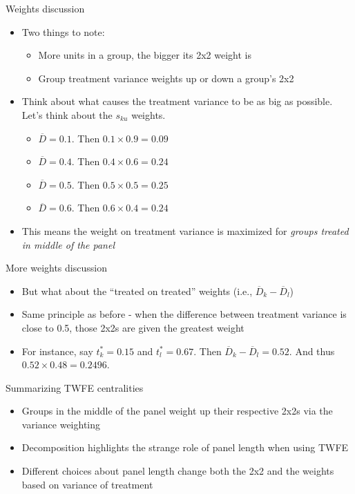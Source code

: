\documentclass{beamer}
\begin{document}
\begin{frame}{Weights discussion}

\begin{itemize}
\item Two things to note:
	\begin{itemize}
	\item More units in a group, the bigger its 2x2 weight is
	\item Group treatment variance weights up or down a group's 2x2
	\end{itemize}
\item Think about what causes the treatment variance to be as big as possible. Let's think about the $s_{ku}$ weights.
	\begin{itemize}
	\item $\overline{D}=0.1$. Then $0.1 \times 0.9 = 0.09$
	\item $\overline{D}=0.4$. Then $0.4 \times 0.6 =0.24$
	\item $\overline{D}=0.5$. Then $0.5 \times 0.5 = 0.25$
	\item $\overline{D}=0.6$. Then $0.6 \times 0.4 = 0.24$
	\end{itemize}
\item This means the weight on treatment variance is maximized for \emph{groups treated in middle of the panel}
\end{itemize}
\end{frame}

\begin{frame}{More weights discussion}

\begin{itemize}
\item But what about the ``treated on treated'' weights (i.e., $\overline{D}_k - \overline{D}_{l} $)  
\item Same principle as before - when the difference between treatment variance is close to 0.5, those 2x2s are given the greatest weight
\item For instance, say $t^*_k=0.15$ and $t^*_l=0.67$. Then $\overline{D}_k - \overline{D}_{l} = 0.52$.  And thus $0.52 \times 0.48 = 0.2496$.
\end{itemize}

\end{frame}


\begin{frame}{Summarizing TWFE centralities}

\begin{itemize}
\item Groups in the middle of the panel weight up their respective 2x2s via the variance weighting
\item Decomposition highlights the strange role of panel length when using TWFE
\item Different choices about panel length change both the 2x2 and the weights based on variance of treatment
\end{itemize}

\end{frame}
\end{document}
